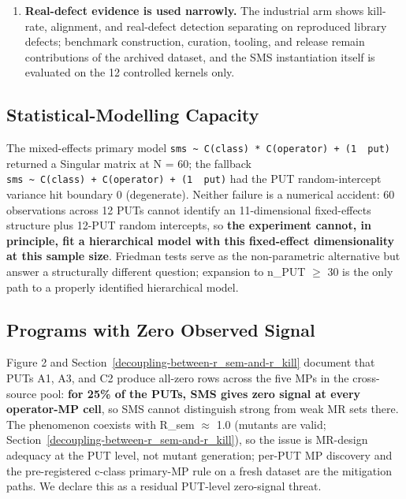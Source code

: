 \documentclass[manuscript,screen,review]{acmart}
\begin{document}
\begin{enumerate}
  \textbf{No proof-carrying semantic-effect certificates.} E1 $\wedge$ E2, LRCA,
  and AST audit trails are empirical and structural audit records, not
  machine-checkable proof objects: no abstraction function to invariant
  domains or per-mutant proof/error-expression certificate yet binds an edit
  to a declared semantic-effect class, the main gap to a certificate-bearing
  framework.
\item
  \textbf{Real-defect evidence is used narrowly.} The industrial arm shows
  kill-rate, alignment, and real-defect detection separating on reproduced
  library defects; benchmark construction, curation, tooling, and release remain
  contributions of the archived dataset, and the SMS instantiation itself is
  evaluated on the 12 controlled kernels only.
\end{enumerate}

\subsection{Statistical-Modelling Capacity}\label{statistical-modelling-capacity-at-n-60-cells-12-puts}

The mixed-effects primary model
\texttt{sms\ \textasciitilde{}\ C(class)\ *\ C(operator)\ +\ (1\ \textbar{}\ put)}
returned a Singular matrix at N = 60; the fallback
\texttt{sms\ \textasciitilde{}\ C(class)\ +\ C(operator)\ +\ (1\ \textbar{}\ put)}
had the PUT random-intercept variance hit boundary 0 (degenerate). Neither
failure is a numerical accident: 60 observations across 12 PUTs cannot
identify an 11-dimensional fixed-effects structure plus 12-PUT random
intercepts, so \textbf{the experiment cannot, in principle, fit a
hierarchical model with this fixed-effect dimensionality at this sample
size}. Friedman tests serve as the non-parametric alternative but answer a
structurally different question; expansion to n\_PUT $\geq$ 30 is the only
path to a properly identified hierarchical model.

\subsection{Programs with Zero Observed Signal}\label{put-level-zero-mass-cohort}

Figure 2 and Section~\ref{decoupling-between-r_sem-and-r_kill} document that PUTs A1, A3, and C2 produce all-zero
rows across the five MPs in the cross-source pool:
\textbf{for 25\% of the PUTs, SMS gives zero signal at every operator-MP
cell}, so SMS cannot distinguish strong from weak MR sets there. The
phenomenon coexists with R\_sem $\approx$ 1.0 (mutants are valid;
Section~\ref{decoupling-between-r_sem-and-r_kill}), so the issue is
MR-design adequacy at the PUT level, not mutant generation; per-PUT MP
discovery and the pre-registered c-class primary-MP rule on a fresh dataset
are the mitigation paths. We declare this as a residual PUT-level
zero-signal threat.
\end{document}
